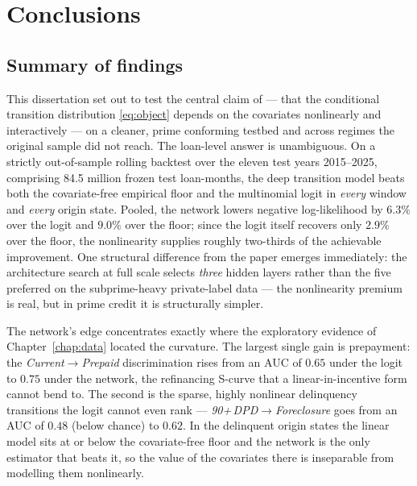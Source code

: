 
\chapter{Conclusions}
\label{chap:conclusions}

\section{Summary of findings}
\label{sec:concl-findings}

This dissertation set out to test the central claim of
\citet{sirignano2021} --- that the conditional transition distribution
\eqref{eq:object} depends on the covariates nonlinearly and
interactively --- on a cleaner, prime conforming testbed and across
regimes the original sample did not reach. The loan-level answer is
unambiguous. On a strictly out-of-sample rolling backtest over the
eleven test years 2015--2025, comprising 84.5 million frozen test
loan-months, the deep transition model beats both the covariate-free
empirical floor and the multinomial logit in \emph{every} window and
\emph{every} origin state. Pooled, the network lowers negative
log-likelihood by $6.3\%$ over the logit and $9.0\%$ over the floor;
since the logit itself recovers only $2.9\%$ over the floor, the
nonlinearity supplies roughly two-thirds of the achievable
improvement. One structural difference from the paper emerges
immediately: the architecture search at full scale selects \emph{three}
hidden layers rather than the five preferred on the subprime-heavy
private-label data --- the nonlinearity premium is real, but in prime
credit it is structurally simpler.

The network's edge concentrates exactly where the exploratory evidence
of Chapter~\ref{chap:data} located the curvature. The largest single
gain is prepayment: the \emph{Current}$\to$\emph{Prepaid} discrimination
rises from an AUC of $0.65$ under the logit to $0.75$ under the network,
the refinancing S-curve that a linear-in-incentive form cannot bend to.
The second is the sparse, highly nonlinear delinquency transitions the
logit cannot even rank --- \emph{90+\,DPD}$\to$\emph{Foreclosure}
goes from an AUC of $0.48$ (below chance) to $0.62$. In the delinquent
origin states the linear model sits at or below the covariate-free
floor and the network is the only estimator that beats it, so the value
of the covariates there is inseparable from modelling them
nonlinearly.

